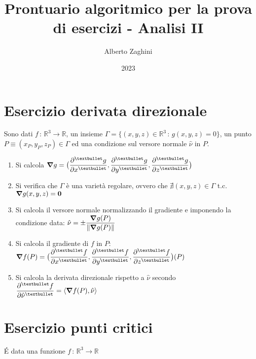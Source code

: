 \documentclass[10pt, oneside]{article}
\title{Prontuario algoritmico per la prova di esercizi - Analisi II}
\author{Alberto Zaghini}
\date{2023}
\begin{document}
\maketitle

\section{Esercizio derivata direzionale}

Sono dati $f \, : \, \mathbb{R}^3 \rightarrow \mathbb{R}$, un insieme $\Gamma = \{(x,y,z) \in \mathbb{R}^3 \, : \, g(x,y,z) = 0\}$, un punto $P \equiv (x_P, y_P, z_P) \in \Gamma$ ed una condizione sul versore normale $\hat{\nu}$ in $P$.

\begin{enumerate}

\item Si calcola $\displaystyle \grad g = \big(
\pdv[•]{g}{x}, \pdv[•]{g}{y}, \pdv[•]{g}{z} \big)$

\item Si verifica che $\Gamma$ è una varietà regolare, ovvero che $\nexists (x,y,z) \in \Gamma$ t.c. $\grad g (x,y,z) = \mathbf{0}$

\item Si calcola il versore normale normalizzando il gradiente e imponendo la condizione data: $\displaystyle \hat{\nu} = \pm \frac{\grad g (P)}{\| \grad g (P) \|}$

\item Si calcola il gradiente di $f$ in $P$: $\displaystyle \grad f (P) = \big(
\pdv[•]{f}{x}, \pdv[•]{f}{y}, \pdv[•]{f}{z} \big) (P)$

\item Si calcola la derivata direzionale rispetto a $\hat{\nu}$ secondo $\displaystyle \pdv[•]{f}{\hat{\nu}} (P) = \langle \grad f(P), \hat{\nu} \rangle$

\end{enumerate}

\section{Esercizio punti critici}

\'E data una funzione $f \, : \, \mathbb{R}^3 \rightarrow \mathbb{R}$
\end{document}
